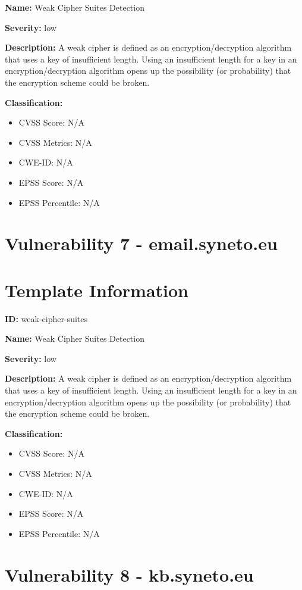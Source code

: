 \textbf{Name:} Weak Cipher Suites Detection

\textbf{Severity:} low

\textbf{Description:} A weak cipher is defined as an encryption/decryption algorithm that uses a key of insufficient length. Using an insufficient length for a key in an encryption/decryption algorithm opens up the possibility (or probability) that the encryption scheme could be broken.

\textbf{Classification:}
\begin{itemize}
\item CVSS Score: N/A
\item CVSS Metrics: N/A
\item CWE-ID: N/A
\item EPSS Score: N/A
\item EPSS Percentile: N/A
\end{itemize}



\section*{Vulnerability 7 - email.syneto.eu}

\section*{Template Information}
\textbf{ID:} weak-cipher-suites

\textbf{Name:} Weak Cipher Suites Detection

\textbf{Severity:} low

\textbf{Description:} A weak cipher is defined as an encryption/decryption algorithm that uses a key of insufficient length. Using an insufficient length for a key in an encryption/decryption algorithm opens up the possibility (or probability) that the encryption scheme could be broken.

\textbf{Classification:}
\begin{itemize}
\item CVSS Score: N/A
\item CVSS Metrics: N/A
\item CWE-ID: N/A
\item EPSS Score: N/A
\item EPSS Percentile: N/A
\end{itemize}



\section*{Vulnerability 8 - kb.syneto.eu}

